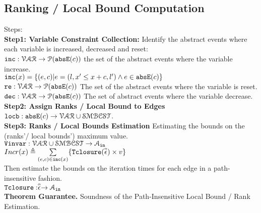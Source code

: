 \subsection{Ranking / Local Bound Computation}
\label{sec:ranking}
Steps:
\\
\textbf{Step1: Variable Constraint Collection:}
Identify the abstract events where each variable is increased, decreased and reset:
\\
${\mathtt{inc}}: \mathcal{VAR} \to \mathcal{P}({\mathtt{abs}}{{\mathtt{E}}}(c)) $
the set of the abstract events where the variable increase.
\\
${\mathtt{inc}}(x) = \{(e, c) | e = (l, x' \leq x + c, l') \land e \in {\mathtt{abs}}{{\mathtt{E}}}(c)\}$
\\
${\mathtt{re}}: \mathcal{VAR} \to \mathcal{P}({\mathtt{abs}}{{\mathtt{E}}}(c)) $
The set of the abstract events where the variable is reset.
\\
${\mathtt{dec}}: \mathcal{VAR} \to \mathcal{P}({\mathtt{abs}}{{\mathtt{E}}}(c)) $
The set of abstract events where the variable decrease.
\\
\textbf{{Step2: Assign Ranks / Local Bound to Edges}}
${\mathtt{locb}}: {\mathtt{abs}}{{\mathtt{E}}}(c) \to \mathcal{VAR} \cup \mathcal{SMBCST}$.
 \\
\textbf{Step3: Ranks / Local Bounds Estimation}
Estimating the bounds on the (ranks'/ local bounds') maximum value.
\\ 
$ {{\mathtt{Vinvar}}}: \mathcal{VAR} \cup \mathcal{SMBCST} \to \mathcal{A}_{{\mathtt{in}}}$
\\
$Incr(x) \triangleq \sum\limits_{(e, c) \in {\mathtt{inc}}(x)}\{{{\mathtt{Tclosure}}}(\stackrel{\scriptscriptstyle{\alpha}}{{\mathtt{\epsilon}}{}}) \times v\}$
\\
Then estimate the bounds on the iteration times
for each edge in a path-insensitive fashion.
\\
${{\mathtt{Tclosure}}}: \stackrel{\scriptscriptstyle{\alpha}}{{\mathtt{\epsilon}}{}} \to \mathcal{A}_{{\mathtt{in}}}$
\\
\textbf{Theorem Guarantee.}
Soundness of the Path-Insensitive Local Bound / Rank Estimation.
